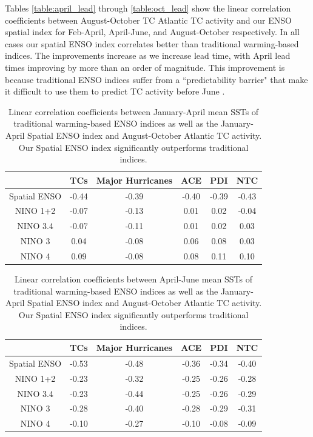 \documentclass[]{article}
\begin{document}
Tables \ref{table:april_lead} through \ref{table:oct_lead} show the linear correlation coefficients between August-October TC Atlantic TC activity and our ENSO spatial index for Feb-April, April-June, and August-October respectively. In all cases our spatial ENSO index correlates better than traditional warming-based indices. The improvements increase as we increase lead time, with April lead times improving by more than an order of magnitude. This improvement is because traditional ENSO indices suffer from a ``predictability barrier" that make it difficult to use them to predict TC activity before June \cite{webster1992}.
\begin{table}
\begin{center}
\begin{tabular}{cccccc}
\hline
&TCs & Major Hurricanes & ACE & PDI & NTC\\
\hline
Spatial ENSO & -0.44 & -0.39 & -0.40 & -0.39 & -0.43\\
NINO 1+2 & -0.07 & -0.13 & 0.01 & 0.02 & -0.04\\
NINO 3.4 & -0.07 & -0.11 & 0.01 & 0.02 & 0.03\\
NINO 3 & 0.04 & -0.08 & 0.06 & 0.08 & 0.03\\
NINO 4 & 0.09 & -0.08 & 0.08 & 0.11 & 0.10\\
\hline
\end{tabular}
\end{center}
\caption{Linear correlation coefficients between January-April mean SSTs of traditional warming-based ENSO indices as well as the January-April Spatial ENSO index and August-October Atlantic TC activity. Our Spatial ENSO index significantly outperforms traditional indices.}
\label{ref:table_jan_apl_corr}
\end{table}

\begin{table}
\begin{center}
\begin{tabular}{cccccc}
\hline
&TCs & Major Hurricanes & ACE & PDI & NTC\\
\hline
Spatial ENSO & -0.53 & -0.48 & -0.36 & -0.34 & -0.40\\
NINO 1+2 & -0.23 & -0.32 & -0.25 & -0.26 & -0.28\\
NINO 3.4 & -0.23 & -0.44 & -0.25 & -0.26 & -0.29\\
NINO 3 & -0.28 & -0.40 & -0.28 & -0.29 & -0.31\\
NINO 4 & -0.10 & -0.27 & -0.10 & -0.08 & -0.09\\
\hline
\end{tabular}
\end{center}
\caption{Linear correlation coefficients between April-June mean SSTs of traditional warming-based ENSO indices as well as the January-April Spatial ENSO index and August-October Atlantic TC activity. Our Spatial ENSO index significantly outperforms traditional indices.}
\label{ref:table_apr_jun}
\end{table}
\end{document}
